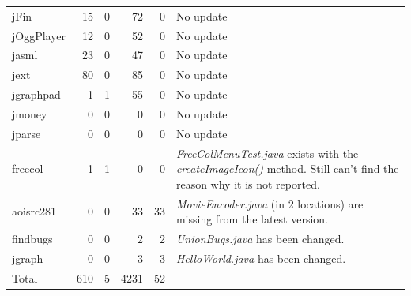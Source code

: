 \documentclass{IEEEtran}
\begin{document}
\begin{table}[H]
\begin{tabular}{l|r|r|r|r|p{5cm}}
	jFin		& 15	& 0		& 72	& 0 & No update \\
	jOggPlayer	& 12 	& 0		& 52	& 0 & No update \\
	jasml		& 23	& 0		& 47	& 0 & No update \\
	jext		& 80	& 0		& 85	& 0 & No update \\
	jgraphpad	& 1		& 1		& 55	& 0 & No update \\
	jmoney		& 0		& 0		& 0		& 0 & No update \\
	jparse		& 0		& 0		& 0		& 0 & No update \\
	\hline
	freecol		& 1		& 1		& 0		& 0		& \textit{FreeColMenuTest.java} exists with the \textit{createImageIcon()} method. Still can't find the reason why it is not reported. \\		
	aoisrc281	& 0		& 0		& 33	& 33 	& \textit{MovieEncoder.java} (in 2 locations) are missing from the latest version. \\
	findbugs	& 0		& 0		& 2		& 2 	& \textit{UnionBugs.java} has been changed. \\
	jgraph		& 0		& 0		& 3		& 3 	& \textit{HelloWorld.java} has been changed. \\
	\hline
	Total		& 610	& 5		& 4231	& 52 	&\\
	\hline
\end{tabular}
\end{table}
\end{document}
